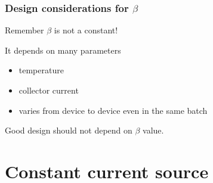 \documentclass[beamer]{standalone}
\begin{document}
\begin{frame}
\frametitle{Design considerations for $\beta$}
Remember \alert{$\beta$ is not a constant!}

It depends on many parameters
\begin{itemize}
	\item temperature
	\item collector current
	\item varies from device to device even in the same batch
\end{itemize}

Good design should not depend on $\beta$ value.
\end{frame}

\section{Constant current source}	
\end{document}
